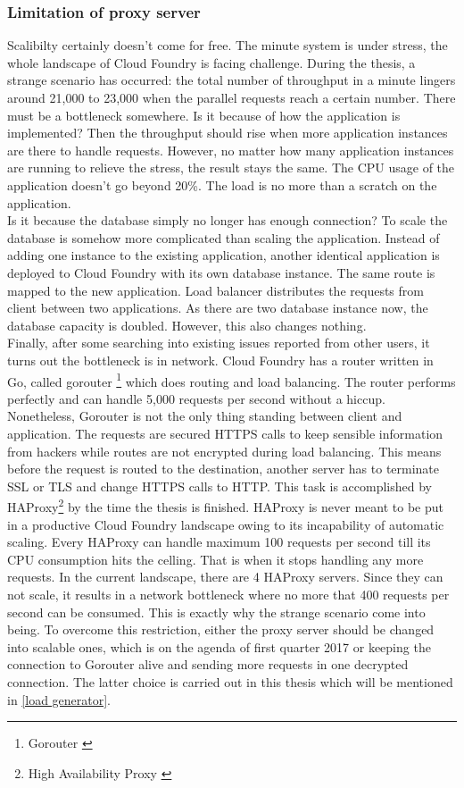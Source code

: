  \subsubsection{Limitation of proxy server}
 \label{haproxy}
Scalibilty certainly doesn't come for free. The minute system is under stress, the whole landscape of Cloud Foundry is facing challenge. During the thesis, a strange scenario has occurred: the total number of throughput in a minute lingers around 21,000 to 23,000 when the parallel requests reach a certain number. There must be a bottleneck somewhere. Is it because of how the application is implemented? Then the throughput should rise when more application instances are there to handle requests. However, no matter how many application instances are running to relieve the stress, the result stays the same.  The CPU usage of the application doesn't go beyond 20\%. The load is no more than a scratch on the application.\\
Is it because the database simply no longer has enough connection? To scale the database is somehow more complicated than scaling the application. Instead of adding one instance to the existing application, another identical application is deployed to Cloud Foundry with its own database instance. The same route is mapped to the new application. Load balancer distributes the requests from client between two applications. As there are two database instance now, the database capacity is doubled. However, this also changes nothing.\\ 
Finally, after some searching into existing issues reported from other users, it turns out the bottleneck is in network. Cloud Foundry has a router written in Go, called gorouter \footnote{ Gorouter \citep{Gorouter}} which does routing and load balancing. The router performs perfectly and can handle 5,000 requests per second without a hiccup. Nonetheless, Gorouter is not the only thing standing between client and application. The requests are secured HTTPS calls to keep sensible information from hackers while routes are not encrypted during load balancing. This means before the request is routed to the destination, another server has to terminate SSL or TLS and change HTTPS calls to HTTP. This task is accomplished by HAProxy\footnote{High Availability Proxy \citep{HAProxy}} by the time the thesis is finished. HAProxy is never meant to be put in a productive Cloud Foundry landscape owing to its incapability of automatic scaling. Every HAProxy can handle maximum 100 requests per second till its CPU consumption hits the celling. That is when it stops handling any more requests. In the current landscape, there are 4 HAProxy servers. Since they can not scale, it results in a network bottleneck where no more that 400 requests per second can be consumed. This is exactly why the strange scenario come into being. To overcome this restriction, either the proxy server should be changed into scalable ones, which is on the agenda of first quarter 2017 or keeping the connection to Gorouter alive and sending more requests in one decrypted connection. The latter choice is carried out in this thesis which will be mentioned in \ref{load generator}.



